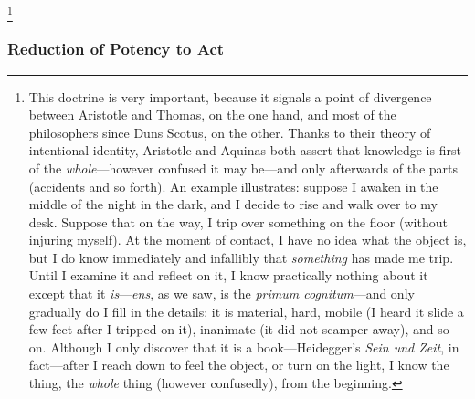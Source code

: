 \footnote{This doctrine is very important, because it signals a point of divergence between Aristotle and Thomas, on the one hand, and most of the philosophers since Duns Scotus, on the other. Thanks to their theory of intentional identity, Aristotle and Aquinas both assert that knowledge is first of the \emph{whole}—however confused it may be—and only afterwards of the parts (accidents and so forth). An example illustrates: suppose I awaken in the middle of the night in the dark, and I decide to rise and walk over to my desk. Suppose that on the way, I trip over something on the floor (without injuring myself). At the moment of contact, I have no idea what the object is, but I do know immediately and infallibly that \emph{something} has made me trip. Until I examine it and reflect on it, I know practically nothing about it except that it \emph{is}—\emph{ens}, as we saw, is the \emph{primum cognitum}—and only gradually do I fill in the details: it is material, hard, mobile (I heard it slide a few feet after I tripped on it), inanimate (it did not scamper away), and so on. Although I only discover that it is a book—Heidegger’s \emph{Sein und Zeit}, in fact—after I reach down to feel the object, or turn on the light, I know the thing, the \emph{whole} thing (however confusedly), from the beginning.}

\subsubsection{Reduction of Potency to Act}
\label{sec:reduction}

